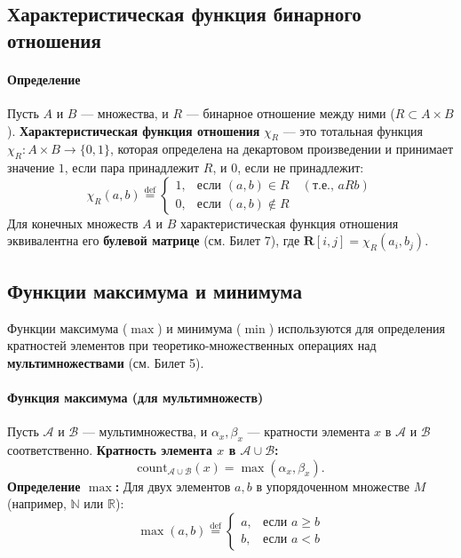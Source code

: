 \subsection*{Характеристическая функция бинарного отношения}

\paragraph{Определение}
Пусть $A$ и $B$ --- множества, и $R$ --- бинарное отношение между ними ($R \subset A \times B$). \textbf{Характеристическая функция отношения} $\chi_R$ --- это тотальная функция $\chi_R: A \times B \to \{0, 1\}$, которая определена на декартовом произведении и принимает значение $1$, если пара принадлежит $R$, и $0$, если не принадлежит:
$$\chi_R(a, b) \stackrel{\text{def}}{=} \begin{cases}
1, & \text{если } (a, b) \in R \quad (\text{т.е., } a R b) \\
0, & \text{если } (a, b) \notin R
\end{cases}$$
Для конечных множеств $A$ и $B$ характеристическая функция отношения эквивалентна его \textbf{булевой матрице} (см. Билет 7), где $\mathbf{R}[i, j] = \chi_R(a_i, b_j)$.

\subsection*{Функции максимума и минимума}

Функции максимума ($\max$) и минимума ($\min$) используются для определения кратностей элементов при теоретико-множественных операциях над \textbf{мультимножествами} (см. Билет 5).

\paragraph{Функция максимума (для мультимножеств)}
Пусть $\mathcal{A}$ и $\mathcal{B}$ --- мультимножества, и $\alpha_x, \beta_x$ --- кратности элемента $x$ в $\mathcal{A}$ и $\mathcal{B}$ соответственно.
\textbf{Кратность элемента $x$ в $\mathcal{A} \cup \mathcal{B}$:}
$$\text{count}_{\mathcal{A} \cup \mathcal{B}}(x) = \max(\alpha_x, \beta_x).$$
\textbf{Определение $\max$:} Для двух элементов $a, b$ в упорядоченном множестве $M$ (например, $\mathbb{N}$ или $\mathbb{R}$):
$$\max(a, b) \stackrel{\text{def}}{=} \begin{cases}
a, & \text{если } a \ge b \\
b, & \text{если } a < b
\end{cases}$$


